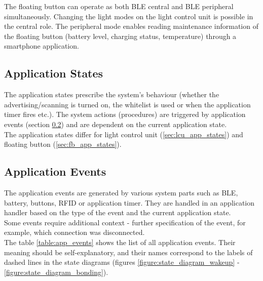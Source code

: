     The floating button can operate as both BLE central and BLE peripheral simultaneously. Changing the light modes on the light control unit is possible in the central role. The peripheral mode enables reading maintenance information of the floating button (battery level, charging status, temperature) through a smartphone application.
    
    \subsection{Application States}
        \label{sec:app_states}
        The application states prescribe the system's behaviour (whether the advertising/scanning is turned on, the whitelist is used or when the application timer fires etc.). The system actions (procedures) are triggered by application events (section \ref{sec:app_events}) and are dependent on the current application state.\\
        The application states differ for light control unit (\ref{sec:lcu_app_states}) and floating button (\ref{sec:fb_app_states}).
        
    \subsection{Application Events}
        \label{sec:app_events}
        The application events are generated by various system parts such as BLE, battery, buttons, RFID or application timer. They are handled in an application handler based on the type of the event and the current application state.\\
        Some events require additional context - further specification of the event, for example, which connection was disconnected.\\
        The table \ref{table:app_events} shows the list of all application events. Their meaning should be self-explanatory, and their names correspond to the labels of dashed lines in the state diagrams (figures \ref{figure:state_diagram_wakeup} - \ref{figure:state_diagram_bonding}).
        
